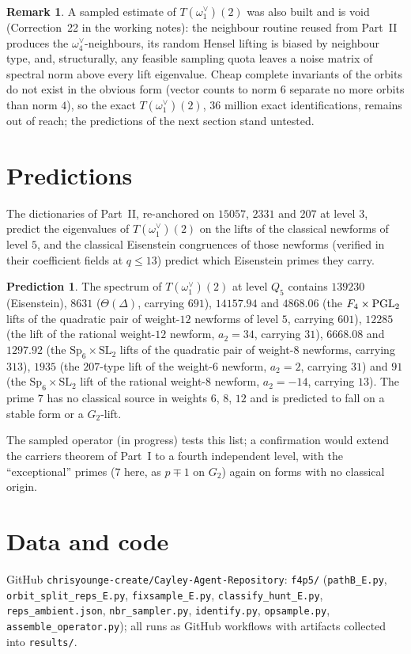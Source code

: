 \documentclass[11pt]{article}
\theoremstyle{definition}\newtheorem{computation}[theorem]{Computation}\newtheorem{remark}[theorem]{Remark}\newtheorem{prediction}[theorem]{Prediction}
\begin{document}
\begin{remark}
A sampled estimate of $T(\omega_1^\vee)(2)$ was also built and is void (Correction~22 in the working notes): the neighbour routine reused from Part~II produces the $\omega_4^\vee$-neighbours, its random Hensel lifting is biased by neighbour type, and, structurally, any feasible sampling quota leaves a noise matrix of spectral norm above every lift eigenvalue. Cheap complete invariants of the orbits do not exist in the obvious form (vector counts to norm $6$ separate no more orbits than norm $4$), so the exact $T(\omega_1^\vee)(2)$, $36$ million exact identifications, remains out of reach; the predictions of the next section stand untested.
\end{remark}

\section{Predictions}
The dictionaries of Part~II, re-anchored on $15057$, $2331$ and $207$ at level $3$, predict the eigenvalues of $T(\omega_1^\vee)(2)$ on the lifts of the classical newforms of level $5$, and the classical Eisenstein congruences of those newforms (verified in their coefficient fields at $q\le13$) predict which Eisenstein primes they carry.
\begin{prediction}\label{pred}
The spectrum of $T(\omega_1^\vee)(2)$ at level $Q_5$ contains $139230$ (Eisenstein), $8631$ ($\Theta(\Delta)$, carrying $691$), $14157.94$ and $4868.06$ (the $F_4\times\mathrm{PGL}_2$ lifts of the quadratic pair of weight-$12$ newforms of level $5$, carrying $601$), $12285$ (the lift of the rational weight-$12$ newform, $a_2=34$, carrying $31$), $6668.08$ and $1297.92$ (the $\mathrm{Sp}_6\times\mathrm{SL}_2$ lifts of the quadratic pair of weight-$8$ newforms, carrying $313$), $1935$ (the $207$-type lift of the weight-$6$ newform, $a_2=2$, carrying $31$) and $91$ (the $\mathrm{Sp}_6\times\mathrm{SL}_2$ lift of the rational weight-$8$ newform, $a_2=-14$, carrying $13$). The prime $7$ has no classical source in weights $6$, $8$, $12$ and is predicted to fall on a stable form or a $G_2$-lift.
\end{prediction}
The sampled operator (in progress) tests this list; a confirmation would extend the carriers theorem of Part~I to a fourth independent level, with the ``exceptional'' primes ($7$ here, as $p\mp1$ on $G_2$) again on forms with no classical origin.

\section*{Data and code}
GitHub \texttt{chrisyounge-create/Cayley-Agent-Repository}: \texttt{f4p5/} (\texttt{pathB\_E.py}, \texttt{orbit\_split\_reps\_E.py}, \texttt{fixsample\_E.py}, \texttt{classify\_hunt\_E.py}, \texttt{reps\_ambient.json}, \texttt{nbr\_sampler.py}, \texttt{identify.py}, \texttt{opsample.py}, \texttt{assemble\_operator.py}); all runs as GitHub workflows with artifacts collected into \texttt{results/}.
\end{document}
